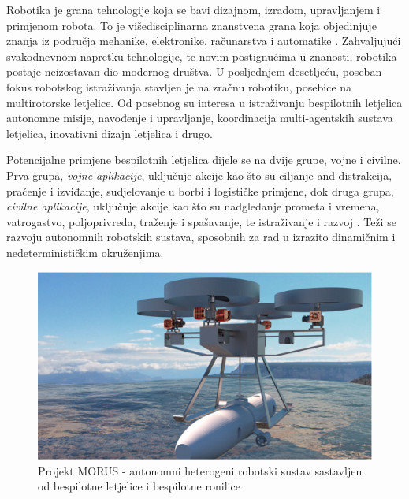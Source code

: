 \documentclass[11pt,a4paper]{article}
\begin{document}
Robotika je grana tehnologije koja se bavi dizajnom, izradom, upravljanjem i primjenom robota. To je višedisciplinarna znanstvena grana koja objedinjuje znanja iz područja mehanike, elektronike, računarstva i automatike \cite{kova}. Zahvaljujući svakodnevnom napretku tehnologije, te novim postignućima u znanosti, robotika postaje neizostavan dio modernog društva. U posljednjem desetljeću, poseban fokus robotskog istraživanja stavljen je na zračnu robotiku, posebice na multirotorske letjelice. Od posebnog su interesa u istraživanju bespilotnih letjelica autonomne misije, navođenje i upravljanje, koordinacija multi-agentskih sustava letjelica, inovativni dizajn letjelica i drugo. 

\medskip

Potencijalne primjene bespilotnih letjelica dijele se na dvije grupe, vojne i civilne. Prva grupa, \textit{vojne aplikacije}, uključuje akcije kao što su ciljanje and distrakcija, praćenje i izviđanje, sudjelovanje u borbi i logističke primjene, dok druga grupa, \textit{civilne aplikacije}, uključuje akcije kao što su nadgledanje prometa i vremena, vatrogastvo, poljoprivreda, traženje i spašavanje, te istraživanje i razvoj \cite{urs}. Teži se razvoju autonomnih robotskih sustava, sposobnih za rad u izrazito dinamičnim i nedeterminističkim okruženjima.

\medskip

\begin{figure}[H]
	\centering
	\includegraphics[scale=0.35]{koord}
	\caption{Projekt MORUS - autonomni heterogeni robotski sustav sastavljen od bespilotne letjelice i bespilotne ronilice \cite{haus2}}
	\label{fig:koord}
\end{figure}
\end{document}
